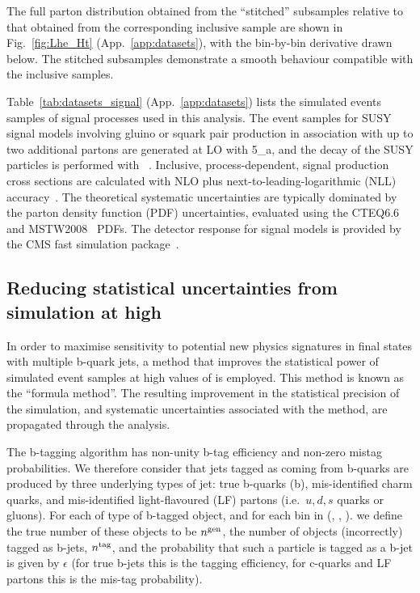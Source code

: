 The full parton \scalht distribution obtained from the ``stitched''
subsamples relative to that obtained from the corresponding inclusive
sample are shown in Fig.~\ref{fig:Lhe_Ht} (App.~\ref{app:datasets}),
with the bin-by-bin derivative drawn below. The stitched subsamples
demonstrate a smooth behaviour compatible with the inclusive samples.

Table~\ref{tab:datasets_signal} (App.~\ref{app:datasets}) lists the
simulated events samples of signal processes used in this
analysis. The event samples for SUSY signal models involving gluino or
squark pair production in association with up to two additional
partons are generated at LO with {\MADGRAPH{}5\_a\MCATNLO}, and the
decay of the SUSY particles is performed with ~\cite{pythia}. Inclusive, process-dependent, signal production
cross sections are calculated with NLO plus
next-to-leading-logarithmic (NLL) accuracy~\cite{Beenakker:1996ch,
  PhysRevLett.102.111802, PhysRevD.80.095004, 1126-6708-2009-12-041,
  doi:10.1142/S0217751X11053560, susynlo}. The theoretical systematic
uncertainties are typically dominated by the parton density function
(PDF) uncertainties, evaluated using the
CTEQ6.6~\cite{Nadolsky:2008zw} and MSTW2008~\cite{Martin:2009iq} PDFs.
The detector response for signal models is provided by the CMS fast
simulation package~\cite{fastsim}.

\subsection{Reducing statistical uncertainties from simulation at high \texorpdfstring{\nb}{Nb}}

In order to maximise sensitivity to potential new physics signatures
in final states with multiple b-quark jets, a method that improves the
statistical power of simulated event samples at high values of \nb is
employed. This method is known as the ``formula method''. The
resulting improvement in the statistical precision of the simulation,
and systematic uncertainties associated with the method, are
propagated through the analysis.

The b-tagging algorithm has non-unity b-tag efficiency and non-zero mistag probabilities.
We therefore consider that jets tagged as coming from b-quarks are produced by
three underlying types of jet: true b-quarks (b), mis-identified charm quarks,
and mis-identified light-flavoured (LF) partons (i.e.\ $u,d,s$ quarks or gluons).
For each of type of b-tagged object, and for each bin in (\njet , \scalht, \mht).  
we define the true number of these objects
to be $n^{\rm gen}$, the number of objects (incorrectly) tagged as b-jets, 
$n^{\rm tag}$, and the probability that such a particle is tagged as a b-jet
is given by $\epsilon$ (for true b-jets this is the tagging efficiency, for 
c-quarks and LF partons this is the mis-tag probability).

